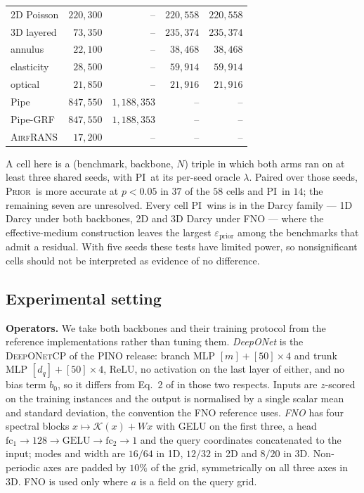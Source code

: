 \documentclass{article}
\newcommand{\armpi}{\textsc{PI}}
\newcommand{\armprior}{\textsc{Prior}}
\begin{document}
\begin{table}[t]
\begin{tabular}{lrrrr}
2D Poisson & $220{,}300$ & -- & $220{,}558$ & $220{,}558$\\
3D layered & $73{,}350$ & -- & $235{,}374$ & $235{,}374$\\
annulus & $22{,}100$ & -- & $38{,}468$ & $38{,}468$\\
elasticity & $28{,}500$ & -- & $59{,}914$ & $59{,}914$\\
optical & $21{,}850$ & -- & $21{,}916$ & $21{,}916$\\
Pipe \citep{li2023fourier} & $847{,}550$ & $1{,}188{,}353$ & -- & --\\
Pipe-GRF & $847{,}550$ & $1{,}188{,}353$ & -- & --\\
\textsc{AirfRANS} & $17{,}200$ & -- & -- & --\\
\bottomrule
\end{tabular}
  \vspace{-3mm}
\end{table}

A cell here is a (benchmark, backbone, $N$) triple in which both arms ran on at least three shared seeds, with \armpi\ at its per-seed oracle $\lambda$. Paired over those seeds, \armprior\ is more accurate at $p<0.05$ in $37$ of the $58$ cells and \armpi\ in $14$; the remaining seven are unresolved. Every cell \armpi\ wins is in the Darcy family --- 1D Darcy under both backbones, 2D and 3D Darcy under \textsc{FNO} --- where the effective-medium construction leaves the largest $\varepsilon_{\mathrm{prior}}$ among the benchmarks that admit a residual. With five seeds these tests have limited power, so nonsignificant cells should not be interpreted as evidence of no difference.

\subsection{Experimental setting}
\label{app:e1-setting}

\textbf{Operators.} We take both backbones and their training protocol from the reference
implementations rather than tuning them.
\emph{DeepONet} is the \textsc{DeepONetCP} of the PINO release: branch MLP $[m]+[50]\times4$ and
trunk MLP $[d_q]+[50]\times4$, ReLU, no activation on the last layer of either, and no bias term
$b_0$, so it differs from Eq.~2 of \citet{lu2021learning} in those two respects. Inputs are
$z$-scored on the training instances and the output is normalised by a single scalar mean and
standard deviation, the convention the FNO reference uses.
\emph{FNO} \citep{li2020fourier} has four spectral blocks $x\mapsto\mathcal{K}(x)+Wx$ with GELU on
the first three, a head $\mathrm{fc}_1\!\to\!128\!\to\!\mathrm{GELU}\!\to\!\mathrm{fc}_2\!\to\!1$
and the query coordinates concatenated to the input; modes and width are $16/64$ in 1D, $12/32$ in
2D and $8/20$ in 3D. Non-periodic axes are padded by $10\%$ of the grid, symmetrically on all three
axes in 3D. FNO is used only where $a$ is a field on the query grid.
\end{document}
